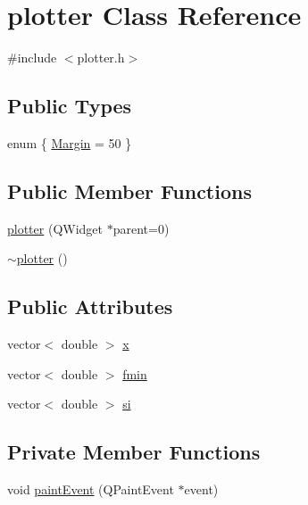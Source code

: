 \hypertarget{classplotter}{
\section{plotter Class Reference}
\label{classplotter}
}


{\ttfamily \#include $<$plotter.h$>$}

\subsection*{Public Types}
\begin{DoxyCompactItemize}
\item 
enum \{ \hyperlink{classplotter_a835971f15f6e1d13cc937e0148fa5e05a09c07970f1030dd3a110bed7c1ddda89}{Margin} =  50
 \}
\end{DoxyCompactItemize}
\subsection*{Public Member Functions}
\begin{DoxyCompactItemize}
\item 
\hyperlink{classplotter_ac2c97e06fd82a35453851f507c366eb7}{plotter} (QWidget $\ast$parent=0)
\item 
\hyperlink{classplotter_afd88fcbc5b6eacac3a72697a3d1cab8d}{$\sim$plotter} ()
\end{DoxyCompactItemize}
\subsection*{Public Attributes}
\begin{DoxyCompactItemize}
\item 
vector$<$ double $>$ \hyperlink{classplotter_a4c6ee2390dfa3557b08631bf1ecb35f1}{x}
\item 
vector$<$ double $>$ \hyperlink{classplotter_a64f92ea6035560769da7394ee5b5f0db}{fmin}
\item 
vector$<$ double $>$ \hyperlink{classplotter_a7cfad03a29e1eec67a4d7d1021da3aee}{si}
\end{DoxyCompactItemize}
\subsection*{Private Member Functions}
\begin{DoxyCompactItemize}
\item 
void \hyperlink{classplotter_ac1fd83a3a57494cdacbe03fa28c98ce5}{paintEvent} (QPaintEvent $\ast$event)
\end{DoxyCompactItemize}


